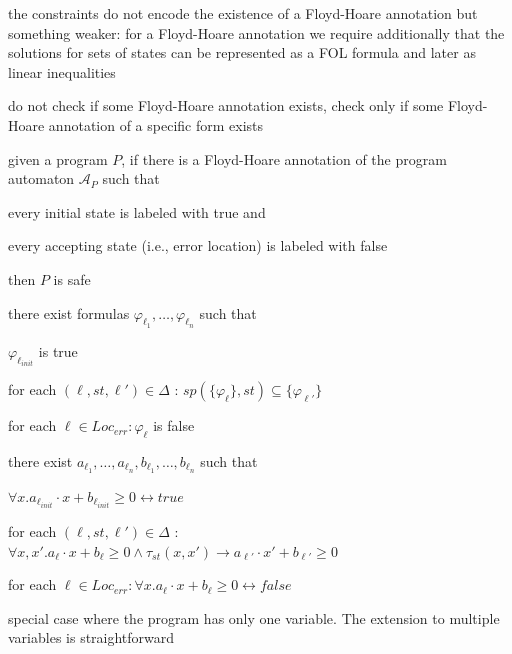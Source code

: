 \documentclass[a4paper]{article}
\begin{document}
\begin{minipage}[t]{0.16\linewidth}
\begin{betterlist}
{{\begin{betterlist}
					\begin{betterlist}
						\item the constraints do not encode the existence of a Floyd-Hoare annotation but something weaker: for a Floyd-Hoare annotation we require additionally that the solutions for sets of states can be represented as a FOL formula and later as linear inequalities
						\item do not check if some Floyd-Hoare annotation exists, check only if some Floyd-Hoare annotation of a specific form exists
						\item given a program $P$, if there is a Floyd-Hoare annotation of the program automaton $\mathcal{A}_P$ such that
						\begin{betterlist}
							\item every initial state is labeled with true and
							\item every accepting state (i.e., error location) is labeled with false
						\end{betterlist}
              then $P$ is safe
						\item there exist formulas $\varphi_{\ell_1},\ldots , \varphi_{\ell_n}$ such that
						\begin{betterlist}
							\item $\varphi_{\ell_{init}}$ is true
							\item for each $(\ell , st, \ell ' ) \in \Delta$ : $sp(\{ \varphi_{\ell} \} , st) \subseteq \{ \varphi_{\ell'}\}$
							\item for each $\ell \in Loc_{err} : \varphi_{\ell}$ is false
						\end{betterlist}
						\item there exist $a_{\ell_1},\ldots, a_{\ell_n}, b_{\ell_1},\ldots, b_{\ell_n}$ such that
						\begin{betterlist}
							\item $\forall x. a_{\ell_{init}} \cdot  x + b_{\ell_{init}} \geq 0 \leftrightarrow true$
							\item for each $(\ell, st, \ell') \in \Delta$ : $\forall x, x' . a_{\ell} \cdot  x + b_{\ell} \geq 0 \land \tau_{st}(x, x') \rightarrow a_{\ell'} \cdot x' + b_{\ell'} \geq 0$
							\item for each $\ell \in Loc_{err} : \forall x. a_{\ell} \cdot  x + b_{\ell} \geq 0 \leftrightarrow false$
							\item special case where the program has only one variable. The extension to multiple variables is straightforward
						\end{betterlist}

\end{betterlist}
\end{betterlist}}}
\end{betterlist}
\end{minipage}
\end{document}
